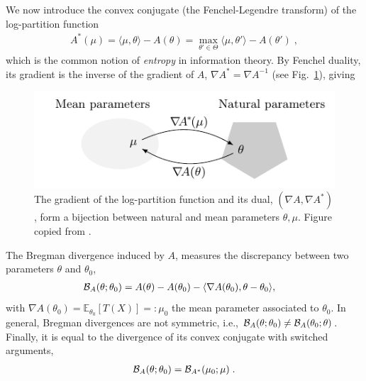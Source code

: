 \documentclass[twoside]{article}
\newcommand*{\expect}[2][]{\ensuremath{\mathbb{E}_{#1} \left[ #2 \right] }} %
\newcommand{\logpart}{A}
\newcommand{\conj}{\logpart^*}
\newcommand{\bregman}{\cB_\logpart}
\newcommand{\bregmanconj}{\cB_{\logpart^*}}
\newcommand{\nat}{\theta}
\newcommand{\m}{\mu}
\newcommand{\meanp}{\m}
\begin{document}
We now introduce the convex conjugate (the Fenchel-Legendre transform) of the log-partition function
\begin{align}
	\conj(\m) =  \langle \m, \nat \rangle - \logpart(\nat)
	=  \max_{\nat'\in\Theta}  \langle \m, \nat' \rangle - \logpart(\nat')\; ,
\end{align}
which is the common notion of \textit{entropy} in information theory.
By Fenchel duality, its gradient is the inverse of the gradient of $\logpart$,  $\nabla\conj=\nabla\logpart^{-1}$
(see Fig.~\ref{fig:duality}), giving
\aligns{
	\nabla\conj \circ \nabla\logpart(\nat) = \nat, \quad \nabla\logpart\circ \nabla\conj(\meanp) = \meanp.
}
\begin{figure}[t]
	\centering
	\includegraphics{duality}
	\caption{The gradient of the log-partition function and its dual, $(\nabla \logpart, \nabla \conj)$, form a bijection between natural and mean parameters $\nat, \meanp$. Figure copied from \citet{kunstner2020homeomorphic}. %
	}
	\label{fig:duality}
\end{figure}%
%
The Bregman divergence induced by $\logpart$,
measures the discrepancy between two parameters $\nat$ and $\nat_0$,
\begin{align}
    \bregman (\nat ; \nat_0)
    & = \logpart(\nat) - \logpart(\nat_0)
    - \langle \nabla \logpart(\nat_0)  , \nat - \nat_0 \rangle,
    \label{eq:defBregman}
\end{align}
with $\nabla \logpart(\nat_0) = \expect[\nat_0]{T(X)} =: \meanp_0$ the mean parameter associated to $\nat_0$.
In general, Bregman divergences are not symmetric, i.e., $\bregman (\nat ; \nat_0)\neq \bregman (\nat_0 ; \nat)$.
Finally, it is equal to the divergence of its convex conjugate with switched arguments,
\begin{align}
	\bregman (\nat ; \nat_0)
    = \bregmanconj ( \meanp_0 ; \meanp) \; .
    \label{eq:bregman_switch}
\end{align}
\end{document}
